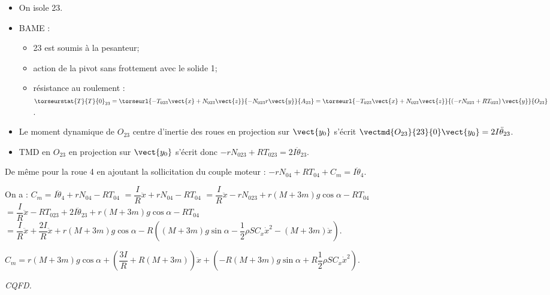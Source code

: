 \ifprof
\begin{corrige}
\begin{itemize}
\item On isole 23. 
\item BAME : 
\begin{itemize}
\item 23 est soumis à la pesanteur;
\item action de la pivot sans frottement avec le solide 1;
\item résistance au roulement : $\torseurstat{T}{T}{0}_{23}=\torseurl{-T_{023}\vect{x}+N_{023}\vect{z}}{-N_{023}r\vect{y}}{A_{23}}=\torseurl{-T_{023}\vect{x}+N_{023}\vect{z}}{\left(-rN_{023}+RT_{023} \right)\vect{y}}{O_{23}}$.
\end{itemize}
\item Le moment dynamique de $O_{23}$ centre d'inertie des roues en projection sur $\vect{y_0}$ s'écrit $\vectmd{O_{23}}{23}{0}\vect{y_0}=2I\ddot{\theta}_{23}$.
\item TMD en $O_{23}$ en projection sur $\vect{y_0}$ s'écrit donc $-rN_{023}+RT_{023}=2I\ddot{\theta}_{23}$.
\end{itemize}
De même pour la roue 4 en ajoutant la sollicitation du couple moteur : 
$-rN_{04}+RT_{04}+C_m=I\ddot{\theta}_{4}$.
\end{corrige}
\else
\fi

\ifprof
\begin{corrige}
On a :
%
%
$C_m=I\ddot{\theta}_{4}+rN_{04}-RT_{04}$ $=\dfrac{I}{R}\ddot{x}+rN_{04}-RT_{04}$
$=\dfrac{I}{R}\ddot{x}-rN_{023}+r\left(M+3m\right)g \cos \alpha -RT_{04}$
$=\dfrac{I}{R}\ddot{x}-RT_{023}+2I\ddot{\theta}_{23}+r\left(M+3m\right)g \cos \alpha -RT_{04}$
$=\dfrac{I}{R}\ddot{x}+\dfrac{2I}{R}\ddot{x}+r\left(M+3m\right)g \cos \alpha -R\left(\left(M+3m\right)g\sin \alpha -\dfrac{1}{2}\rho S C_x \dot{x}^2-\left(M+3m\right)\ddot{x}\right)$. 

$C_m=r\left(M+3m\right)g \cos \alpha+\left(\dfrac{3I}{R}+R\left(M+3m\right)\right)\ddot{x} +\left(-R\left(M+3m\right)g\sin \alpha+ R\dfrac{1}{2}\rho S C_x \dot{x}^2\right)$. 

\begin{flushright}
\textit{CQFD.}
\end{flushright}

\end{corrige}
\else
\fi

